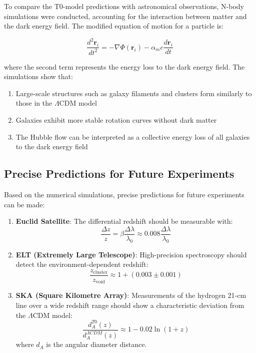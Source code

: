 \documentclass[a4paper,12pt]{article}
\theoremstyle{definition}
\theoremstyle{remark}
\begin{document}
	To compare the T0-model predictions with astronomical observations, N-body simulations were conducted, accounting for the interaction between matter and the dark energy field. The modified equation of motion for a particle is:
	
	\begin{equation}
		\frac{d^2\mathbf{r}_i}{dt^2} = -\nabla \Phi(\mathbf{r}_i) - \alpha_m c \frac{d\mathbf{r}_i}{dt}
	\end{equation}
	
	where the second term represents the energy loss to the dark energy field. The simulations show that:
	
	\begin{enumerate}
		\item Large-scale structures such as galaxy filaments and clusters form similarly to those in the \(\Lambda\)CDM model
		\item Galaxies exhibit more stable rotation curves without dark matter
		\item The Hubble flow can be interpreted as a collective energy loss of all galaxies to the dark energy field
	\end{enumerate}
	
	\subsection{Precise Predictions for Future Experiments}
	
	Based on the numerical simulations, precise predictions for future experiments can be made:
	
	\begin{enumerate}
		\item \textbf{Euclid Satellite}: The differential redshift should be measurable with:
		\begin{equation}
			\frac{\Delta z}{z} = \beta \frac{\Delta \lambda}{\lambda_0} \approx 0.008 \frac{\Delta \lambda}{\lambda_0}
		\end{equation}
		
		\item \textbf{ELT (Extremely Large Telescope)}: High-precision spectroscopy should detect the environment-dependent redshift:
		\begin{equation}
			\frac{z_{\text{cluster}}}{z_{\text{void}}} \approx 1 + (0.003 \pm 0.001)
		\end{equation}
		
		\item \textbf{SKA (Square Kilometre Array)}: Measurements of the hydrogen 21-cm line over a wide redshift range should show a characteristic deviation from the \(\Lambda\)CDM model:
		\begin{equation}
			\frac{d_A^{T0}(z)}{d_A^{\Lambda CDM}(z)} \approx 1 - 0.02 \ln(1+z)
		\end{equation}
		where \(d_A\) is the angular diameter distance.
	\end{enumerate}
	
\end{document}
